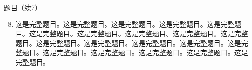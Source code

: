 \documentclass[aspectratio=169,10pt,fontset=fandol]{ctexbeamer}
\begin{document}
\begin{frame}[t,fragile]{题目（续7）}
\normalsize
{\normalsize
\begin{enumerate}\setcounter{enumi}{7}
\item 这是完整题目。这是完整题目。这是完整题目。这是完整题目。这是完整题目。这是完整题目。这是完整题目。这是完整题目。这是完整题目。这是完整题目。这是完整题目。这是完整题目。这是完整题目。这是完整题目。这是完整题目。这是完整题目。这是完整题目。这是完整题目。这是完整题目。这是完整题目。\end{enumerate}
}
\end{frame}
\end{document}
